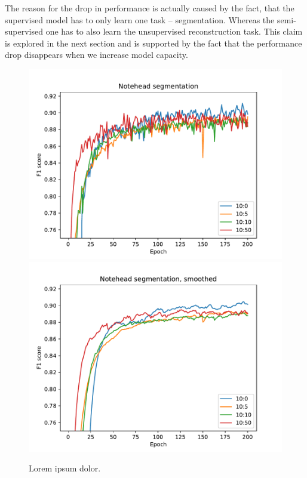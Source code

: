 The reason for the drop in performance is actually caused by the fact, that the supervised model has to only learn one task -- segmentation. Whereas the semi-supervised one has to also learn the unsupervised reconstruction task. This claim is explored in the next section and is supported by the fact that the performance drop disappears when we increase model capacity.

\begin{figure}[p]
    \centering
    \includegraphics[width=140mm]{../../figures/01-exploration-noteheads/noteheads-dropout.pdf}
    \includegraphics[width=140mm]{../../figures/01-exploration-noteheads/noteheads-dropout-smooth.pdf}
    \caption{Lorem ipsum dolor.}
    \label{fig:ExplorationNoteheads}
\end{figure}

